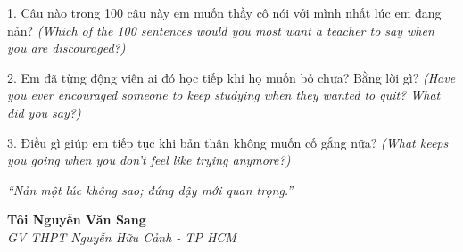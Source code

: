 \begin{tuhocnhanh}
1. Câu nào trong 100 câu này em muốn thầy cô nói với mình nhất lúc em đang nản? \textit{(Which of the 100 sentences would you most want a teacher to say when you are discouraged?)}

2. Em đã từng động viên ai đó học tiếp khi họ muốn bỏ chưa? Bằng lời gì? \textit{(Have you ever encouraged someone to keep studying when they wanted to quit? What did you say?)}

3. Điều gì giúp em tiếp tục khi bản thân không muốn cố gắng nữa? \textit{(What keeps you going when you don't feel like trying anymore?)}
\end{tuhocnhanh}

\begin{center}
\textit{\color{amber}``Nản một lúc không sao; đứng dậy mới quan trọng.''}
\end{center}

\begin{flushright}
\textbf{Tôi Nguyễn Văn Sang}\\
\textit{GV THPT Nguyễn Hữu Cảnh - TP HCM}
\end{flushright}

\ngancach
